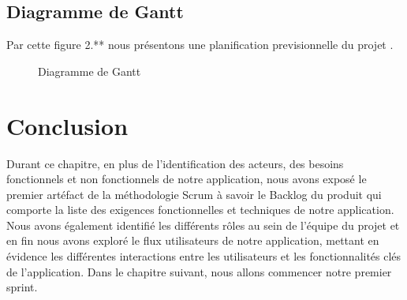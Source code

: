 

\newpage
\subsection{Diagramme de Gantt }

Par cette figure 2.** nous présentons une planification previsionnelle du projet .

     \begin{figure}[h!]
       \centering
       \caption{Diagramme de Gantt}
     \end{figure}
     \newpage






\newpage
\section*{Conclusion}
\bigskip
\begin{sloppypar}
Durant ce chapitre, en plus de l'identification  des acteurs, des besoins fonctionnels et non fonctionnels de notre application,  nous avons exposé le premier artéfact de la méthodologie Scrum à savoir le Backlog du produit qui comporte la liste des exigences fonctionnelles et techniques de notre application. Nous avons également identifié les différents rôles au sein de l'équipe du projet et en fin nous avons  exploré le flux utilisateurs de notre application, mettant en évidence les différentes interactions entre les utilisateurs et les fonctionnalités clés de l'application.
Dans le chapitre suivant, nous allons commencer notre premier sprint.
\end{sloppypar}


